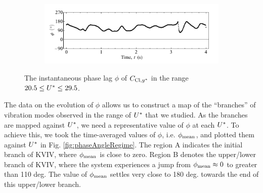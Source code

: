 \documentclass[oneside]{utmthesis}
\begin{document}
\begin{figure} \continuedfloat
  \centering
  \begin{subfigure}[h]{1\textwidth}
    \includegraphics[width=\textwidth]{figs/phaseAngle-e}
    \caption{}
    \label{fig:phaseAngle-e}
  \end{subfigure}
  \caption{The instantaneous phase lag $\phi$ of $C_{\text{Cl},y^{*}}$ in the range $20.5 \leq U^{*} \leq 29.5$.}
  \label{fig:phaseAngle}
\end{figure}

The data on the evolution of $\phi$ allows us to construct a map of the ``branches'' of vibration modes observed in the range of $U^{*}$ that we studied. As the branches are mapped against $U^{*}$, we need a representative value of $\phi$ at each $U^{*}$. To achieve this, we took the time-averaged values of $\phi$, i.e. $\phi_{\text{mean}}$, and plotted them against $U^{*}$ in Fig. \ref{fig:phaseAngleRegime}. The region A indicates the initial branch of  KVIV, where  $\phi_{\text{mean}}$ is close to zero. Region B denotes the upper/lower branch of  KVIV, where the system experiences a jump from  $\phi_{\text{mean}} \approx 0$ to greater than 110 deg. The value of $\phi_{\text{mean}}$ settles very close to 180 deg. towards the end of this upper/lower branch.
\end{document}

